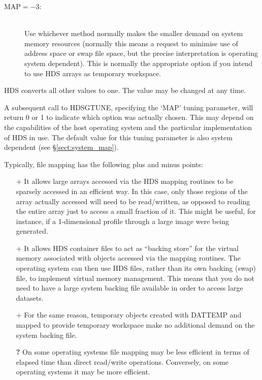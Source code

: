 \documentclass[twoside,11pt]{article}
\newcommand{\htmlref}[2]{#1}
\renewcommand{\_}{\texttt{\symbol{95}}}
\newcommand{\qt}[1]{``#1''}
\newcommand{\mplus}[0]{{$+$}}
\newcommand{\qt}[1]{{\tt{"}}#1{\tt{"}}}
\newcommand{\mplus}[0]{+}
\begin{document}
\begin{description}
\begin{description}
\item[MAP$=-$3:]\mbox{}\\
Use whichever method normally makes the smaller demand on system
memory resources (normally this means a request to minimise use of
address space or swap file space, but the precise interpretation is
operating system dependent). This is normally the appropriate option
if you intend to use HDS arrays as temporary workspace.

\end{description}

HDS converts all other values to one. The value may be changed at any
time.

A subsequent call to \htmlref{HDS\_GTUNE}{HDS_GTUNE}, specifying the
`MAP' tuning parameter, will return 0 or 1 to indicate which option
was actually chosen. This may depend on the capabilities of the host
operating system and the particular implementation of HDS in use. The
default value for this tuning parameter is also system dependent (see
\S\ref{sect:system_map}).

Typically, file mapping has the following plus and minus points:

\begin{itemize}

\item[{\bf \mplus}] It allows large arrays accessed via the HDS mapping
routines to be sparsely accessed in an efficient way. In this case,
only those regions of the array actually accessed will need to be
read/written, as opposed to reading the entire array just to access a
small fraction of it. This might be useful, for instance, if a
1-dimensional profile through a large image were being generated.

\item[{\bf \mplus}] It allows HDS container files to act as \qt{backing store}
for the virtual memory associated with objects accessed via the
mapping routines. The operating system can then use HDS files, rather
than its own backing (swap) file, to implement virtual memory
management. This means that you do not need to have a large system
backing file available in order to access large datasets.

\item[{\bf \mplus}] For the same reason, temporary objects created with
\htmlref{DAT\_TEMP}{DAT_TEMP} and mapped to provide temporary
workspace make no additional demand on the system backing file.

\item[{\bf ?}] On some operating systems file mapping may be less
efficient in terms of elapsed time than direct read/write
operations. Conversely, on some operating systems it may be more
efficient.


\end{itemize}
\end{description}
\end{document}
